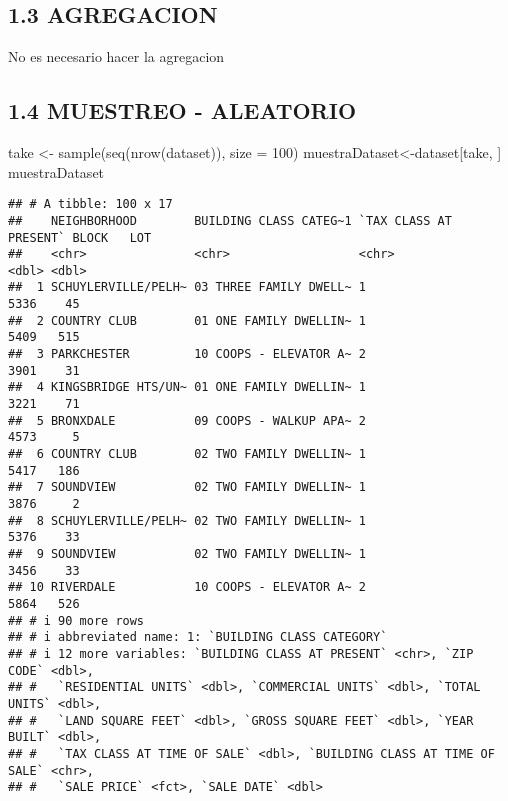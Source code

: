 \documentclass[
]{article}
\newenvironment{Shaded}{\begin{snugshade}}{\end{snugshade}}
\newcommand{\AttributeTok}[1]{\textcolor[rgb]{0.77,0.63,0.00}{#1}}
\newcommand{\DecValTok}[1]{\textcolor[rgb]{0.00,0.00,0.81}{#1}}
\newcommand{\FunctionTok}[1]{\textcolor[rgb]{0.00,0.00,0.00}{#1}}
\newcommand{\NormalTok}[1]{#1}
\newcommand{\OtherTok}[1]{\textcolor[rgb]{0.56,0.35,0.01}{#1}}
\begin{document}
\hypertarget{agregacion}{%
\subsection{1.3 AGREGACION}\label{agregacion}}

No es necesario hacer la agregacion

\hypertarget{muestreo---aleatorio}{%
\subsection{1.4 MUESTREO - ALEATORIO}\label{muestreo---aleatorio}}

\begin{Shaded}
\begin{Highlighting}[]
\NormalTok{take }\OtherTok{\textless{}{-}} \FunctionTok{sample}\NormalTok{(}\FunctionTok{seq}\NormalTok{(}\FunctionTok{nrow}\NormalTok{(dataset)), }\AttributeTok{size =} \DecValTok{100}\NormalTok{)}
\NormalTok{muestraDataset}\OtherTok{\textless{}{-}}\NormalTok{dataset[take, ]}
\NormalTok{muestraDataset}
\end{Highlighting}
\end{Shaded}

\begin{verbatim}
## # A tibble: 100 x 17
##    NEIGHBORHOOD        BUILDING CLASS CATEG~1 `TAX CLASS AT PRESENT` BLOCK   LOT
##    <chr>               <chr>                  <chr>                  <dbl> <dbl>
##  1 SCHUYLERVILLE/PELH~ 03 THREE FAMILY DWELL~ 1                       5336    45
##  2 COUNTRY CLUB        01 ONE FAMILY DWELLIN~ 1                       5409   515
##  3 PARKCHESTER         10 COOPS - ELEVATOR A~ 2                       3901    31
##  4 KINGSBRIDGE HTS/UN~ 01 ONE FAMILY DWELLIN~ 1                       3221    71
##  5 BRONXDALE           09 COOPS - WALKUP APA~ 2                       4573     5
##  6 COUNTRY CLUB        02 TWO FAMILY DWELLIN~ 1                       5417   186
##  7 SOUNDVIEW           02 TWO FAMILY DWELLIN~ 1                       3876     2
##  8 SCHUYLERVILLE/PELH~ 02 TWO FAMILY DWELLIN~ 1                       5376    33
##  9 SOUNDVIEW           02 TWO FAMILY DWELLIN~ 1                       3456    33
## 10 RIVERDALE           10 COOPS - ELEVATOR A~ 2                       5864   526
## # i 90 more rows
## # i abbreviated name: 1: `BUILDING CLASS CATEGORY`
## # i 12 more variables: `BUILDING CLASS AT PRESENT` <chr>, `ZIP CODE` <dbl>,
## #   `RESIDENTIAL UNITS` <dbl>, `COMMERCIAL UNITS` <dbl>, `TOTAL UNITS` <dbl>,
## #   `LAND SQUARE FEET` <dbl>, `GROSS SQUARE FEET` <dbl>, `YEAR BUILT` <dbl>,
## #   `TAX CLASS AT TIME OF SALE` <dbl>, `BUILDING CLASS AT TIME OF SALE` <chr>,
## #   `SALE PRICE` <fct>, `SALE DATE` <dbl>
\end{verbatim}
\end{document}
